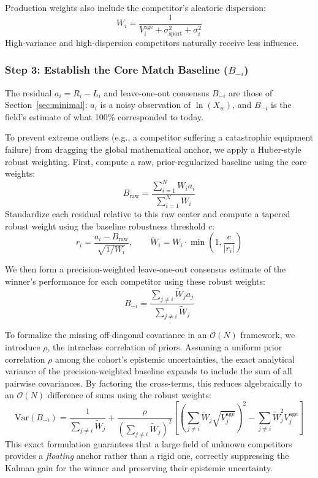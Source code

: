 \documentclass[12pt]{article}
\newcommand{\sigmai}{\sigma_i^2}
\newcommand{\ssport}{\sigma_{\mathrm{sport}}^2}      %
\newcommand{\xwin}{X_w}
\newcommand{\bloo}{B_{-i}}
\begin{document}
	Production weights also include the competitor's aleatoric dispersion:
	\begin{equation}
		W_i = \frac{1}{V_i^{\mathrm{age}} + \ssport + \sigmai}
	\end{equation}
	High-variance and high-dispersion competitors naturally receive less influence.

	\subsubsection*{Step 3: Establish the Core Match Baseline ($B_{-i}$)}
	The residual $a_i = R_i - L_i$ and leave-one-out consensus $\bloo$ are those of Section~\ref{sec:minimal}: $a_i$ is a noisy observation of $\ln(\xwin)$, and $\bloo$ is the field's estimate of what 100\% corresponded to today.

	To prevent extreme outliers (e.g., a competitor suffering a catastrophic equipment failure) from dragging the global mathematical anchor, we apply a Huber-style robust weighting. First, compute a raw, prior-regularized baseline using the core weights:
	\begin{equation}
		B_{\mathrm{raw}} = \frac{\sum_{i=1}^N W_i a_i}{\sum_{i=1}^N W_i}
	\end{equation}
	Standardize each residual relative to this raw center and compute a tapered robust weight using the baseline robustness threshold $c$:
	\begin{equation}
		r_i = \frac{a_i - B_{\mathrm{raw}}}{\sqrt{1/W_i}}, \qquad \tilde{W}_i = W_i \cdot \min\!\left(1, \frac{c}{|r_i|}\right)
	\end{equation}

	We then form a precision-weighted leave-one-out consensus estimate of the winner's performance for each competitor using these robust weights:
	\begin{equation}
		B_{-i} = \frac{\sum_{j \neq i} \tilde{W}_j a_j}{\sum_{j \neq i} \tilde{W}_j}
	\end{equation}

	To formalize the missing off-diagonal covariance in an $\mathcal{O}(N)$ framework, we introduce $\rho$, the intraclass correlation of priors. Assuming a uniform prior correlation $\rho$ among the cohort's epistemic uncertainties, the exact analytical variance of the precision-weighted baseline expands to include the sum of all pairwise covariances. By factoring the cross-terms, this reduces algebraically to an $\mathcal{O}(N)$ difference of sums using the robust weights:
	\begin{equation}
		\mathrm{Var}(B_{-i}) = \frac{1}{\sum_{j \neq i} \tilde{W}_j} + \frac{\rho}{\left(\sum_{j \neq i} \tilde{W}_j\right)^2} \left[ \left( \sum_{j \neq i} \tilde{W}_j \sqrt{V_j^{\mathrm{age}}} \right)^2 - \sum_{j \neq i} \tilde{W}_j^2 V_j^{\mathrm{age}} \right]
	\end{equation}
	This exact formulation guarantees that a large field of unknown competitors provides a \emph{floating} anchor rather than a rigid one, correctly suppressing the Kalman gain for the winner and preserving their epistemic uncertainty.
\end{document}
